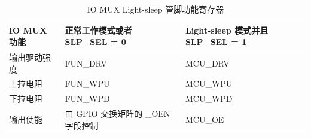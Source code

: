\begin{longtable}[c]{|p{4cm}|p{5cm}|p{6cm}|}
    \caption{IO MUX Light-sleep 管脚功能寄存器}
    \label{table:iomux sleep}
        \\\hline
        \rowcolor{lightgray}
    IO MUX 功能   & 正常工作模式或者 SLP\_SEL = 0 & Light-sleep 模式并且 SLP\_SEL = 1 \\\hline
    输出驱动强度 & FUN\_DRV & MCU\_DRV \\
    \hline
    上拉电阻 & FUN\_WPU & MCU\_WPU \\
    \hline
    下拉电阻 & FUN\_WPD & MCU\_WPD \\
    \hline
    输出使能 & 由 GPIO 交换矩阵的 \_OEN 字段控制 & MCU\_OE \\
    \hline
    \end{longtable}